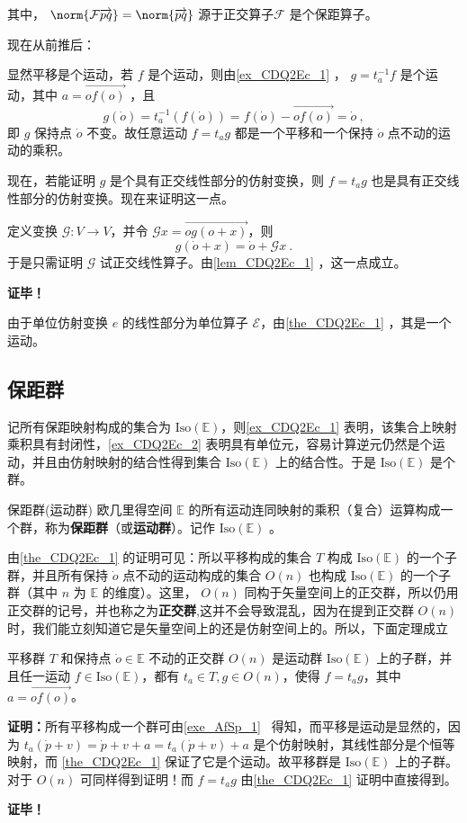 其中， $\norm{\mathcal F\overrightarrow{pq}}=\norm{\overrightarrow{pq}}$ 源于正交算子$\mathcal F$ 是个保距算子。 %

现在从前推后：

显然平移是个运动，若 $f$ 是个运动，则由\autoref{ex_CDQ2Ec_1} ， $g=t_a^{-1} f$ 是个运动，其中 $a=\overrightarrow{of(o)}$ ，且
\begin{equation}
g(\dot o)=t_a^{-1}(f(\dot o))=f(\dot o)-\overrightarrow{of(o)}=\dot o~,
\end{equation}
即 $g$ 保持点 $\dot o$ 不变。故任意运动 $f=t_ag$ 都是一个平移和一个保持 $\dot o$ 点不动的运动的乘积。

现在，若能证明 $g$ 是个具有正交线性部分的仿射变换，则 $f=t_a g$ 也是具有正交线性部分的仿射变换。现在来证明这一点。

定义变换 $\mathcal G:V\rightarrow V$，并令 $\mathcal G x=\overrightarrow{og(o+x)}$，则
\begin{equation}\label{eq_CDQ2Ec_1}
g(\dot o+x)=\dot o+\mathcal G x~.
\end{equation}
于是只需证明 $\mathcal G$ 试正交线性算子。由\autoref{lem_CDQ2Ec_1} ，这一点成立。

\textbf{证毕！}
\begin{example}{}\label{ex_CDQ2Ec_2}
由于单位仿射变换 $e$ 的线性部分为单位算子 $\mathcal E$，由\autoref{the_CDQ2Ec_1} ，其是一个运动。
\end{example}
\subsection{保距群}
记所有保距映射构成的集合为 $\mathrm{Iso(\mathbb E)}$，则\autoref{ex_CDQ2Ec_1} 表明，该集合上映射乘积具有封闭性，\autoref{ex_CDQ2Ec_2} 表明具有单位元，容易计算逆元仍然是个运动，并且由仿射映射的结合性得到集合 $\mathrm{Iso(\mathbb E)}$ 上的结合性。于是 $\mathrm{Iso}(\mathbb E)$ 是个群。
\begin{definition}{保距群(运动群)}
欧几里得空间 $\mathbb E$ 的所有运动连同映射的乘积（复合）运算构成一个群，称为\textbf{保距群}（或\textbf{运动群}）。记作 $\mathrm{Iso(\mathbb E)}$ 。
\end{definition}
由\autoref{the_CDQ2Ec_1} 的证明可见：所以平移构成的集合 $T$ 构成 $\mathrm{Iso}(\mathbb E)$ 的一个子群，并且所有保持 $\dot o$ 点不动的运动构成的集合 $O(n)$ 也构成 $\mathrm{Iso}(\mathbb E)$ 的一个子群（其中 $n$ 为 $\mathbb E$ 的维度）。这里， $O(n)$ 同构于矢量空间上的正交群，所以仍用正交群的记号，并也称之为\textbf{正交群},这并不会导致混乱，因为在提到正交群 $O(n)$ 时，我们能立刻知道它是矢量空间上的还是仿射空间上的。所以，下面定理成立
\begin{theorem}{}
平移群 $T$ 和保持点 $\dot o\in\mathbb E$ 不动的正交群 $O(n)$ 是运动群 $\mathrm{Iso(\mathbb E)}$ 上的子群，并且任一运动 $f\in\mathrm{Iso(\mathbb E)}$，都有 $t_a\in T,g\in O(n)$，使得 $f=t_ag$，其中 $a=\overrightarrow{of(o)}$。
\end{theorem}
\textbf{证明：}所有平移构成一个群可由\autoref{exe_AfSp_1}~ 得知，而平移是运动是显然的，因为 $t_a(\dot p+v)=\dot p+v+a=t_a(\dot p+v)+a$ 是个仿射映射，其线性部分是个恒等映射，而 \autoref{the_CDQ2Ec_1} 保证了它是个运动。故平移群是 $\mathrm{Iso(\mathbb E)}$ 上的子群。对于 $O(n)$ 可同样得到证明！而 $f=t_ag$ 由\autoref{the_CDQ2Ec_1} 证明中直接得到。

\textbf{证毕！}
